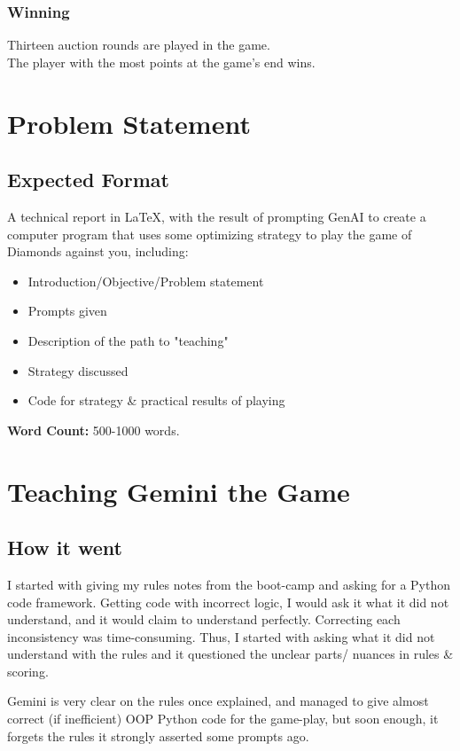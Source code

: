 \documentclass[runningheads]{llncs}
\begin{document}
\subsubsection{Winning}
\hfill \break
Thirteen auction rounds are played in the game.\\
The player with the most points at the game's end wins.

\section{Problem Statement}
\subsection{Expected Format}
A technical report in \LaTeX, with the result of prompting GenAI to create a computer program that uses some optimizing strategy to play the game of Diamonds against you, including:
\begin{itemize}
    \item Introduction/Objective/Problem statement
    \item Prompts given
    \item Description of the path to "teaching"
    \item Strategy discussed
    \item Code for strategy \& practical results of playing
\end{itemize}
\textbf{Word Count:} 500-1000 words.

\section{Teaching Gemini the Game}
\subsection{How it went}
I started with giving my rules notes from the boot-camp and asking for a Python code framework. Getting code with incorrect logic, I would ask it what it did not understand, and it would claim to understand perfectly. Correcting each inconsistency was time-consuming. Thus, I started with asking what it did not understand with the rules and it questioned the unclear parts/ nuances in rules \& scoring.

Gemini is very clear on the rules once explained, and managed to give almost correct (if inefficient) OOP Python code for the game-play, but soon enough, it forgets the rules it strongly asserted some prompts ago.
\end{document}
